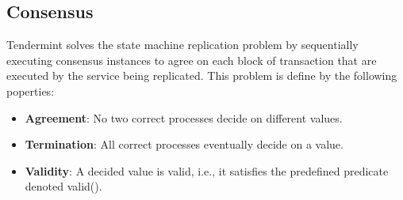 \documentclass{article}
\begin{document}
   \subsection{Consensus}
   Tendermint solves the state machine replication problem by sequentially executing consensus instances to agree on each block of transaction that are executed by the service being replicated. This problem is define by the following poperties:
   \begin{itemize}
   	\item \textbf{Agreement}: No two correct processes decide on different values.
	\item \textbf{Termination}: All correct processes eventually decide on a value.
	\item \textbf{Validity}: A decided value is valid, i.e., it satisfies the predefined predicate denoted valid().
   \end{itemize}
   \newpage
\end{document}
